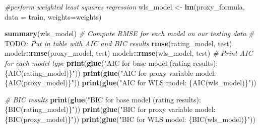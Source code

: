 \documentclass[
  man,floatsintext]{apa6}
\newenvironment{Shaded}{\begin{snugshade}}{\end{snugshade}}
\newcommand{\AlertTok}[1]{\textcolor[rgb]{0.94,0.16,0.16}{#1}}
\newcommand{\AttributeTok}[1]{\textcolor[rgb]{0.13,0.29,0.53}{#1}}
\newcommand{\CommentTok}[1]{\textcolor[rgb]{0.56,0.35,0.01}{\textit{#1}}}
\newcommand{\FunctionTok}[1]{\textcolor[rgb]{0.13,0.29,0.53}{\textbf{#1}}}
\newcommand{\NormalTok}[1]{#1}
\newcommand{\OtherTok}[1]{\textcolor[rgb]{0.56,0.35,0.01}{#1}}
\newcommand{\SpecialCharTok}[1]{\textcolor[rgb]{0.81,0.36,0.00}{\textbf{#1}}}
\newcommand{\StringTok}[1]{\textcolor[rgb]{0.31,0.60,0.02}{#1}}
\begin{document}
\begin{Shaded}
\begin{Highlighting}[]
\CommentTok{\#perform weighted least squares regression}
\NormalTok{wls\_model }\OtherTok{\textless{}{-}} \FunctionTok{lm}\NormalTok{(proxy\_formula, }\AttributeTok{data =}\NormalTok{ train, }\AttributeTok{weights=}\NormalTok{weights)}

\FunctionTok{summary}\NormalTok{(wls\_model)}
\CommentTok{\# Compute RMSE for each model on our testing data}
\CommentTok{\# }\AlertTok{TODO}\CommentTok{: Put in table with AIC and BIC results}
\FunctionTok{rmse}\NormalTok{(rating\_model, test)}
\NormalTok{modelr}\SpecialCharTok{::}\FunctionTok{rmse}\NormalTok{(proxy\_model, test)}
\NormalTok{modelr}\SpecialCharTok{::}\FunctionTok{rmse}\NormalTok{(wls\_model, test)}
\CommentTok{\# Print AIC for each model type}
\FunctionTok{print}\NormalTok{(}\FunctionTok{glue}\NormalTok{(}\StringTok{"AIC for base model (rating results): \{AIC(rating\_model)\}"}\NormalTok{))}
\FunctionTok{print}\NormalTok{(}\FunctionTok{glue}\NormalTok{(}\StringTok{"AIC for proxy variable model: \{AIC(proxy\_model)\}"}\NormalTok{))}
\FunctionTok{print}\NormalTok{(}\FunctionTok{glue}\NormalTok{(}\StringTok{"AIC for WLS model: \{AIC(wls\_model)\}"}\NormalTok{))}

\CommentTok{\# BIC results}
\FunctionTok{print}\NormalTok{(}\FunctionTok{glue}\NormalTok{(}\StringTok{"BIC for base model (rating results): \{BIC(rating\_model)\}"}\NormalTok{))}
\FunctionTok{print}\NormalTok{(}\FunctionTok{glue}\NormalTok{(}\StringTok{"BIC for proxy variable model: \{BIC(proxy\_model)\}"}\NormalTok{))}
\FunctionTok{print}\NormalTok{(}\FunctionTok{glue}\NormalTok{(}\StringTok{"BIC for WLS model: \{BIC(wls\_model)\}"}\NormalTok{))}
\end{Highlighting}
\end{Shaded}
\end{document}
